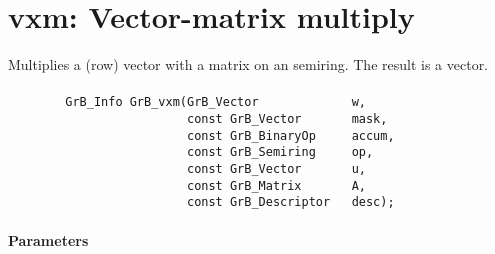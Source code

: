 


\section{{\sf vxm}: Vector-matrix multiply}

Multiplies a (row) vector with a matrix on an semiring. The result is a vector.

\paragraph{\syntax}

\begin{verbatim}
        GrB_Info GrB_vxm(GrB_Vector             w,
                         const GrB_Vector       mask,
                         const GrB_BinaryOp     accum,
                         const GrB_Semiring     op,
                         const GrB_Vector       u, 
                         const GrB_Matrix       A,
                         const GrB_Descriptor   desc);
\end{verbatim}

\paragraph{Parameters}

